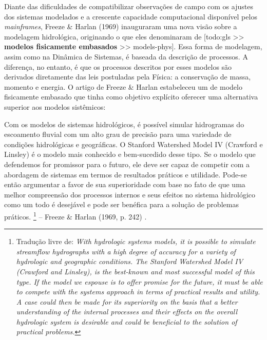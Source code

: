 \documentclass[./main.tex]{subfiles}
\begin{document}
\par Diante das dificuldades de compatibilizar observações de campo com os ajustes dos sistemas modelados e a crescente capacidade computacional disponível pelos \textit{mainframes}, Freeze \& Harlan (1969) inauguraram uma nova visão sobre a modelagem hidrológica, originando o que eles denominaram de [todo:gls >> \textbf{modelos fisicamente embasados} >> models-phys]. Essa forma de modelagem, assim como na Dinâmica de Sistemas, é baseada da descrição de processos. A diferença, no entanto, é que os processos descritos por esses modelos são derivados diretamente das leis postuladas pela Física: a conservação de massa, momento e energia. O artigo de Freeze \& Harlan estabeleceu um  de modelo fisicamente embasado que tinha como objetivo explícito oferecer uma alternativa superior aos modelos sistêmicos:
\begin{adjustwidth}{100pt}{0pt}
\medskip
\small
Com os modelos de sistemas hidrológicos, é possível simular hidrogramas do escoamento fluvial com um alto grau de precisão para uma variedade de condições hidrológicas e geográficas. O Stanford Watershed Model IV (Crawford e Linsley) é o modelo mais conhecido e bem-sucedido desse tipo. Se o modelo que defendemos for promissor para o futuro, ele deve ser capaz de competir com a abordagem de sistemas em termos de resultados práticos e utilidade. Pode-se então argumentar a favor de sua superioridade com base no fato de que uma melhor compreensão dos processos internos e seus efeitos no sistema hidrológico como um todo é desejável e pode ser benéfica para a solução de problemas práticos.
\footnote{Tradução livre de: 
\textit{
With hydrologic systems models, it is possible to simulate streamflow hydrographs with a high degree of accuracy for a variety of hydrologic and geographic conditions. The Stanford Watershed Model IV (Crawford and Linsley), is the best-known and most successful model of this type. If the model we espouse is to offer promise for the future, it must be able to compete with the systems approach in terms of practical results and utility. A case could then be made for its superiority on the basis that a better understanding of the internal processes and their effects on the overall hydrologic system is desirable and could be beneficial to the solution of practical problems.
}} -- Freeze \& Harlan (1969, p. 242) \cite{Freeze1969a}.
\medskip
\end{adjustwidth}
\end{document}
